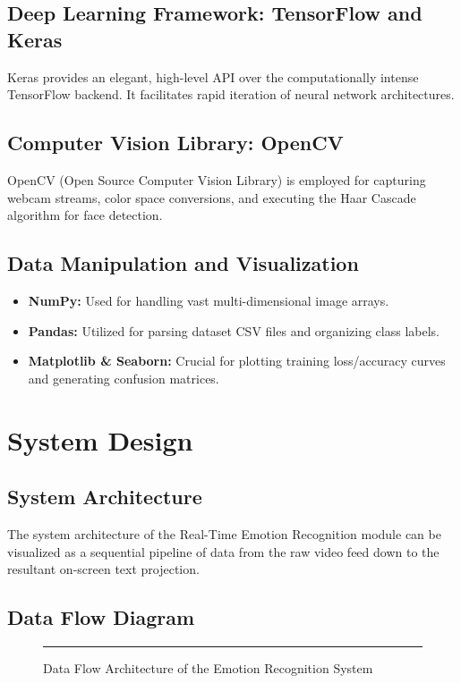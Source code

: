 \documentclass[12pt,a4paper]{report}
\begin{document}
\section{Deep Learning Framework: TensorFlow and Keras}
Keras provides an elegant, high-level API over the computationally intense TensorFlow backend. It facilitates rapid iteration of neural network architectures.
\lipsum[44-46]

\section{Computer Vision Library: OpenCV}
OpenCV (Open Source Computer Vision Library) is employed for capturing webcam streams, color space conversions, and executing the Haar Cascade algorithm for face detection.
\lipsum[47-49]

\section{Data Manipulation and Visualization}
\begin{itemize}
    \item \textbf{NumPy:} Used for handling vast multi-dimensional image arrays.
    \item \textbf{Pandas:} Utilized for parsing dataset CSV files and organizing class labels.
    \item \textbf{Matplotlib \& Seaborn:} Crucial for plotting training loss/accuracy curves and generating confusion matrices.
\end{itemize}
\lipsum[50-55] %


\chapter{System Design}

\section{System Architecture}
The system architecture of the Real-Time Emotion Recognition module can be visualized as a sequential pipeline of data from the raw video feed down to the resultant on-screen text projection.

\lipsum[56-65] %

\section{Data Flow Diagram}
\begin{figure}[H]
    \centering
    \rule{0.8\textwidth}{6cm} %
    \caption{Data Flow Architecture of the Emotion Recognition System}
    \label{fig:dfd}
\end{figure}
\end{document}
